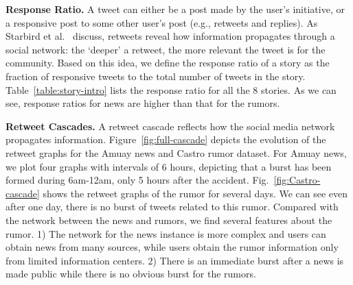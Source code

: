 \textbf{Response Ratio.} A tweet can either be a post made by the
user's initiative,
or a responsive post  to some other user's post (e.g., retweets and replies).
As Starbird et al.~\cite{Starbird:2012} discuss, retweets reveal how
information propagates through a social network: the `deeper' a retweet, the
more relevant the tweet is for the community. Based on this idea,
we define the response ratio of a story as the fraction of responsive tweets
to the total number of tweets in the story.
Table~\ref{table:story-intro} lists the response ratio for all the 8 stories. As we can see, response ratios for news are higher than that for the rumors.

\textbf{Retweet Cascades.} A retweet cascade reflects how the social media network propagates information. Figure~\ref{fig:full-cascade} depicts the evolution of the retweet graphs for the Amuay news and Castro rumor dataset. For Amuay news, we plot four graphs with intervals of 6 hours,
depicting that a burst has been formed during 6am-12am, only 5 hours after the accident.
 Fig.~\ref{fig:Castro-cascade} shows the retweet graphs of the rumor for several days. We can see
 even after one day, there is no burst of tweets related to this rumor.
 Compared with the network between the news and rumors, we find several features about the rumor.
1) The network for the news instance
is more complex and users can obtain news from many sources, while users obtain
the rumor information only from limited information centers. 2) There is an immediate burst after a news is made public while there is no obvious burst for the rumors.



